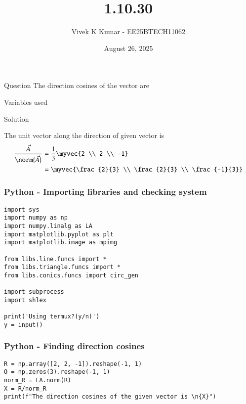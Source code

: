 \documentclass{beamer}
\title 
{1.10.30}
\date{August 26, 2025}
\author 
{Vivek K Kumar - EE25BTECH11062}
\begin{document}
\frame{\titlepage}
\begin{frame}{Question}
The direction cosines of the vector  are \underline{\hspace{0.1\columnwidth}}
\end{frame}



\begin{frame}{Variables used}
\begin{table}[H]    
  \centering
  
  \caption{Variables Used}
  \label{tab:1.10.30}
\end{table}

\end{frame}

\begin{frame}{Solution}

The unit vector along the direction of given vector is\\
\begin{align}
  \frac{\vec{A}}{\norm{\vec{A}}} &= \frac{1}{3}\myvec{2 \\ 2 \\ -1} \\
 &=\myvec{\frac{2}{3} \\ \frac{2}{3} \\ \frac{-1}{3}}
\end{align}

\end{frame}

\begin{frame}[fragile]
    \frametitle{Python - Importing libraries and checking system}
    \begin{lstlisting}
import sys
import numpy as np
import numpy.linalg as LA
import matplotlib.pyplot as plt
import matplotlib.image as mpimg

from libs.line.funcs import *
from libs.triangle.funcs import *
from libs.conics.funcs import circ_gen

import subprocess
import shlex

print('Using termux?(y/n)')
y = input()
\end{lstlisting}
\end{frame}

\begin{frame}[fragile]
    \frametitle{Python - Finding direction cosines}
    \begin{lstlisting}
R = np.array([2, 2, -1]).reshape(-1, 1)
O = np.zeros(3).reshape(-1, 1)
norm_R = LA.norm(R)
X = R/norm_R
print(f"The direction cosines of the given vector is \n{X}")
\end{lstlisting}
\end{frame}
\end{document}
